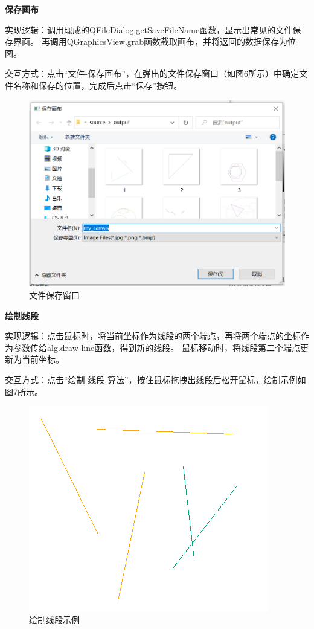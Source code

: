 \documentclass[a4paper,UTF8]{article}
\begin{document}
\textbf{保存画布}

实现逻辑：调用现成的QFileDialog.getSaveFileName函数，显示出常见的文件保存界面。
再调用QGraphicsView.grab函数截取画布，并将返回的数据保存为位图。

交互方式：点击“文件-保存画布”，在弹出的文件保存窗口（如图6所示）中确定文件名称和保存的位置，完成后点击“保存”按钮。
\begin{figure}[H]
    \centering
    \includegraphics[scale=0.6]{save-canvas.PNG}
    \caption{文件保存窗口}
\end{figure}

\textbf{绘制线段}

实现逻辑：点击鼠标时，将当前坐标作为线段的两个端点，再将两个端点的坐标作为参数传给alg.draw\underline{ }line函数，得到新的线段。
鼠标移动时，将线段第二个端点更新为当前坐标。

交互方式：点击“绘制-线段-算法”，按住鼠标拖拽出线段后松开鼠标，绘制示例如图7所示。
\begin{figure}[H]
    \centering
    \includegraphics[scale=0.75]{draw-line.PNG}
    \caption{绘制线段示例}
\end{figure}
\end{document}
